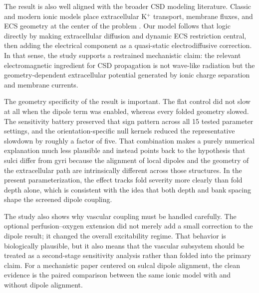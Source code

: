 \documentclass[12pt]{article}
\begin{document}
The result is also well aligned with the broader CSD modeling literature. Classic and modern ionic models place extracellular K$^+$ transport, membrane fluxes, and ECS geometry at the center of the problem \citep{Tuckwell1978,Wei2014,Zandt2015}. Our model follows that logic directly by making extracellular diffusion and dynamic ECS restriction central, then adding the electrical component as a quasi-static electrodiffusive correction. In that sense, the study supports a restrained mechanistic claim: the relevant electromagnetic ingredient for CSD propagation is not wave-like radiation but the geometry-dependent extracellular potential generated by ionic charge separation and membrane currents.

The geometry specificity of the result is important. The flat control did not slow at all when the dipole term was enabled, whereas every folded geometry slowed. The sensitivity battery preserved that sign pattern across all 15 tested parameter settings, and the orientation-specific null kernels reduced the representative slowdown by roughly a factor of five. That combination makes a purely numerical explanation much less plausible and instead points back to the hypothesis that sulci differ from gyri because the alignment of local dipoles and the geometry of the extracellular path are intrinsically different across those structures. In the present parameterization, the effect tracks fold severity more clearly than fold depth alone, which is consistent with the idea that both depth and bank spacing shape the screened dipole coupling.

The study also shows why vascular coupling must be handled carefully. The optional perfusion--oxygen extension did not merely add a small correction to the dipole result; it changed the overall excitability regime. That behavior is biologically plausible, but it also means that the vascular subsystem should be treated as a second-stage sensitivity analysis rather than folded into the primary claim. For a mechanistic paper centered on sulcal dipole alignment, the clean evidence is the paired comparison between the same ionic model with and without dipole alignment.
\end{document}
